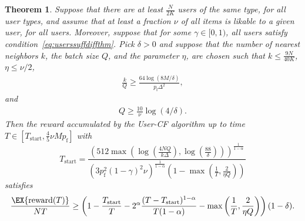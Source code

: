 \documentclass{article}
\newcommand\arewardT{\EX{\mathrm{reward}(T)}}
\newtheorem{theorem}{Theorem}
\newcommand\pf{p_{\mathrm{f}}}
\newcommand\nitem{M}
\begin{document}
\begin{theorem}
\label{thm:UBmaingen}
Suppose that there are at least $\frac{N}{2K}$ users of the same type, for all user types, 
and assume that at least a fraction $\nu$ of all items is likable to a given user, for all users.  
Moreover, suppose that for some $\gamma \in [0,1)$, all users satisfy condition~\eqref{eq:userssuffdiffthm}. 
Pick $\delta >0$ and suppose that the number of nearest neighbors $k$, the batch size $Q$, and the parameter $\eta$, are chosen such that $k \leq \frac{9 N}{40K}$, $\eta \leq \nu/2$,  
\begin{align}
\frac{k}{Q}  \geq  \frac{64 \log( 8M / \delta)}{\pf \Delta^2 } ,
\label{eq:batchthm}
\end{align}
and 
\begin{align}
Q \geq \frac{10}{\nu} \log(4/\delta).
\label{eq:Qgeqinus}
\end{align}
Then the reward accumulated by the 
User-CF algorithm up to time $T \in [T_{\text{start}} , \frac{4}{5} \nu \nitem \pf]$ with 
\[
T_{\text{start}}
=
\frac{
\left(  512 \max\left(\log\left( \frac{4NQ}{k\Delta} %
\right), \log\left(\frac{88}{\delta}\right)\right) 
\right)^{\frac{1}{1-\alpha}}
}{
(3  \pf^2  (1 - \gamma)^2 \nu)^{\frac{1}{1-\alpha}}
\left(1 - \max\left( \frac{1}{T} , \frac{2}{\eta Q}\right)\right) 
}
%
%
\]
satisfies
\begin{align}
\frac{\arewardT}{NT}  \geq \left( 1 - \frac{T_{\text{start}} }{T} 
- 2^\alpha \frac{ (T - T_{\text{start}})^{1-\alpha} }{T(1-\alpha)} -  \max \left( \frac{1}{T} , \frac{2}{\eta Q} \right) \right) (1-\delta). 
\label{eq:lbonregret}
\end{align}
\end{theorem}
\end{document}
